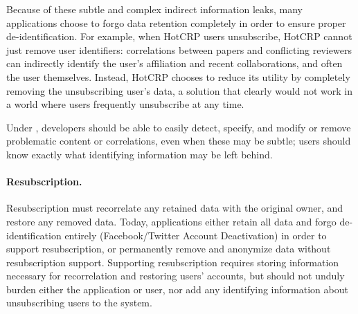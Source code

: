 Because of these subtle and complex indirect information leaks, many applications choose to forgo
data retention completely in order to ensure proper de-identification. For example, when HotCRP
users unsubscribe, 
HotCRP cannot just remove user identifiers: correlations between papers and conflicting  reviewers
can indirectly identify the user's affiliation and recent collaborations, and often the user
themselves. Instead, HotCRP chooses to reduce its utility by completely removing the unsubscribing
user's data, a solution that clearly would not work in a world where users frequently unsubscribe at
any time.

Under \name, developers should be able to easily detect, specify, and modify or remove problematic
content or correlations, even when these may be subtle; users should know exactly what identifying
information may be left behind. 

\paragraph{Resubscription.}
Resubscription must recorrelate any retained data with the original owner, and restore any removed
data. Today, applications either retain all data and forgo de-identification entirely
(Facebook/Twitter Account Deactivation) in order to support resubscription, or permanently remove
and anonymize data without resubscription support. Supporting resubscription requires storing
information necessary for recorrelation and restoring users' accounts, but should not unduly burden
either the application or user, nor add any identifying information about unsubscribing users to the
system.

%


